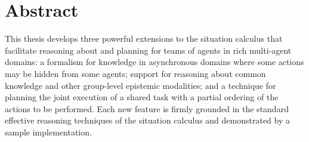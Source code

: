 
\chapter*{Abstract}

This thesis develops three powerful extensions to the situation calculus that
facilitate reasoning about and planning for teams of agents in rich multi-agent
domains: a formalism for knowledge in asynchronous domains where some actions
may be hidden from some agents; support for reasoning about common knowledge
and other group-level epistemic modalities; and a technique for planning the
joint execution of a shared task with a partial ordering of the actions to
be performed.  Each new feature is firmly grounded in the standard effective
reasoning techniques of the situation calculus and demonstrated by a sample
implementation.

